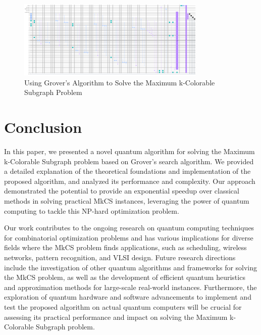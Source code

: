 \begin{figure}[htp]
    \centering
    \includegraphics[width=9cm]{Figures/Maximum_k-Colorable_Subgraph_circuit.png}
    \caption{Using Grover's Algorithm to Solve the Maximum k-Colorable Subgraph Problem}
    \label{fig:Maximum_k-Colorable_Subgraph}
\end{figure}

\section{Conclusion}\label{sec:conclusion}

In this paper, we presented a novel quantum algorithm for solving the Maximum k-Colorable Subgraph problem based on Grover's search algorithm. We provided a detailed explanation of the theoretical foundations and implementation of the proposed algorithm, and analyzed its performance and complexity. Our approach demonstrated the potential to provide an exponential speedup over classical methods in solving practical MkCS instances, leveraging the power of quantum computing to tackle this NP-hard optimization problem.

Our work contributes to the ongoing research on quantum computing techniques for combinatorial optimization problems and has various implications for diverse fields where the MkCS problem finds applications, such as scheduling, wireless networks, pattern recognition, and VLSI design. Future research directions include the investigation of other quantum algorithms and frameworks for solving the MkCS problem, as well as the development of efficient quantum heuristics and approximation methods for large-scale real-world instances. Furthermore, the exploration of quantum hardware and software advancements to implement and test the proposed algorithm on actual quantum computers will be crucial for assessing its practical performance and impact on solving the Maximum k-Colorable Subgraph problem.



